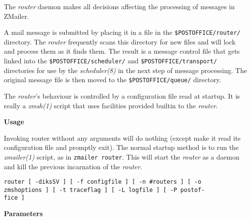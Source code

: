 
The {\em router\/} daemon makes all decisions affecting 
the processing of messages in ZMailer.

A mail message is submitted by placing it in a file in the
{\tt \$POSTOFFICE/router/} directory. The 
{\em router\/} frequently scans this directory for new 
files and will lock and process them as it finds them. 
The result is a message control file that gets linked into 
the {\tt \$POSTOFFICE/scheduler/} and 
{\tt \$POSTOFFICE/transport/} directories for use 
by the {\em scheduler(8)\/} in the next step of message 
processing. The original message file is then moved to the 
{\tt \$POSTOFFICE/queue/} directory. 

The {\em router\/}'s behaviour is controlled by a 
configuration file read at startup. It is really a 
{\em zmsh(1)\/} script that uses facilities provided 
builtin to the {\em router\/}. 

{\bf Usage}

Invoking router without any arguments will do nothing
(except make it read its configuration file and promptly
exit). The normal startup method is to run the {\em zmailer(1)\/} 
script, as in {\tt zmailer router}. This will start the 
{\em router\/} as a daemon and  kill the previous 
incarnation of the {\em router\/}. 

\begin{tscreen}
\begin{verbatim}
router [ -diksSV ] [ -f configfile ] [ -n #routers ] [ -o 
zmshoptions ] [ -t traceflag ] [ -L logfile ] [ -P postof-
fice ] 
\end{verbatim}
\end{tscreen}
 

{\bf Parameters}

